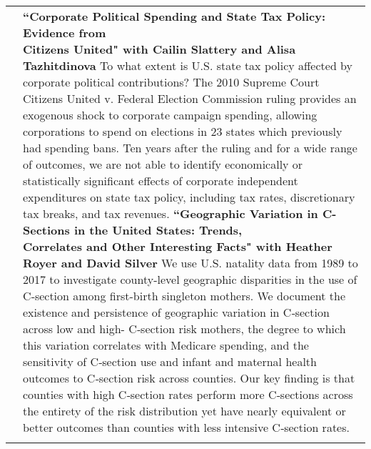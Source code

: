 \documentclass[11pt]{article}
\begin{document}
\begin{tabularx}{\textwidth}{@{}Y Z@{}}
	&
	\textbf{``Corporate Political Spending and State Tax Policy: Evidence from \newline  Citizens United" with Cailin Slattery and Alisa Tazhitdinova}
		\vspace{5pt} \newline
	To what extent is U.S. state tax policy affected by corporate political contributions? The 2010 Supreme Court Citizens United v. Federal Election Commission ruling provides an exogenous shock to corporate campaign spending, allowing corporations to spend on elections in 23 states which previously had spending bans. Ten years after the ruling and for a wide range of outcomes, we are not able to identify economically or statistically significant effects of corporate independent expenditures on state tax policy, including tax rates, discretionary tax breaks, and tax revenues.
	\vspace{20pt} \newline
	\textbf{``Geographic Variation in C-Sections in the United States: Trends,  \newline Correlates and Other Interesting Facts" with Heather Royer and David Silver}
	\vspace{5pt} \newline
	We use U.S. natality data from 1989 to 2017 to investigate county-level geographic disparities in the use of C‑section among ﬁrst-birth singleton mothers. We document the existence and persistence of geographic variation in C‑section across low and high- C‑section risk mothers, the degree to which this variation correlates with Medicare spending, and the sensitivity of C‑section use and infant and maternal health outcomes to C‑section risk across counties. Our key ﬁnding is that counties with high C‑section rates perform more C‑sections across the entirety of the risk distribution yet have nearly equivalent or better outcomes than counties with less intensive C‑section rates.
	\vspace{0pt}
	\\ \addlinespace[20pt] 
	


\end{tabularx}
\end{document}

